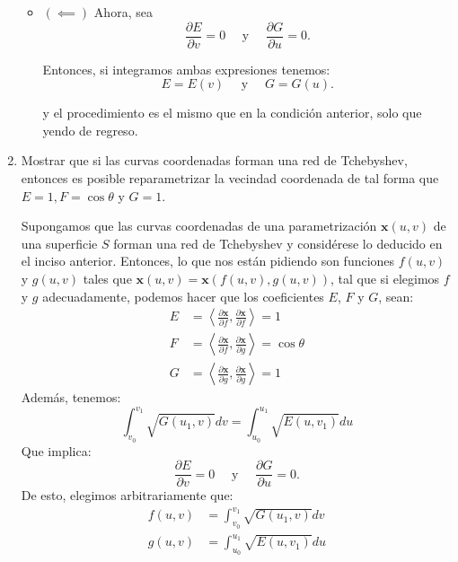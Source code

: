 \begin{problema}
\begin{enumerate}
\begin{dem}
\begin{itemize}
    \item $(\impliedby)$ Ahora, sea 
    $$
        \frac{\partial E}{\partial v}=0 \quad \text { y } \quad \frac{\partial G}{\partial u}=0.
        $$

    Entonces, si integramos ambas expresiones tenemos: 
    $$
        E=E(v) \quad \text { y } \quad G=G(u).
        $$

    y el procedimiento es el mismo que en la condición anterior, solo que yendo de regreso. 
\end{itemize}


\end{dem}
        
        \item Mostrar que si las curvas coordenadas forman una red de Tchebyshev, entonces es posible reparametrizar la vecindad coordenada de tal forma que $E=1, F=\cos \theta$ y $G=1$.
        \begin{dem} Supongamos que las curvas coordenadas de una parametrización $\mathbf{x}(u, v)$ de una superficie $S$ forman una red de Tchebyshev y considérese lo deducido en el inciso anterior. Entonces, lo que nos están pidiendo son funciones $f(u,v)$ y $g(u,v)$ tales que $\mathbf{x}(u,v) = \mathbf{x}(f(u,v),g(u,v))$, tal que si elegimos $f$ y $g$ adecuadamente, podemos hacer que los coeficientes $E$, $F$ y $G$, sean: 
            \begin{align*}
                E &= \left\langle \frac{\partial \mathbf{x}}{\partial f}, \frac{\partial \mathbf{x}}{\partial f} \right\rangle = 1\\
                 F &= \left\langle \frac{\partial \mathbf{x}}{\partial f}, \frac{\partial \mathbf{x}}{\partial g} \right\rangle =\cos \theta \\
             G &= \left\langle \frac{\partial \mathbf{x}}{\partial g}, \frac{\partial \mathbf{x}}{\partial g} \right\rangle =1
            \end{align*}
            Además, tenemos: 
            $$ \int_{v_0}^{v_1} \sqrt{G(u_1,v)}dv = \int_{u_0}^{u_1} \sqrt{E(u,v_1)}du $$
            Que implica: 
            $$
        \frac{\partial E}{\partial v}=0 \quad \text { y } \quad \frac{\partial G}{\partial u}=0.
        $$
            De esto, elegimos arbitrariamente que: 
            \begin{align*}
                f(u,v) &=  \int_{v_0}^{v_1} \sqrt{G(u_1,v)}dv \\
                g(u,v) &= \int_{u_0}^{u_1} \sqrt{E(u,v_1)}du
            \end{align*}

\end{dem}
\end{enumerate}
\end{problema}
